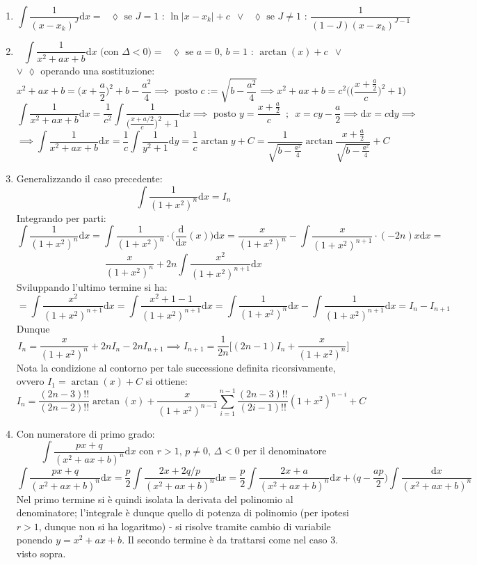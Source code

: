\documentclass[10pt]{article}
\theoremstyle{plain}
\begin{document}
\begin{enumerate}
    \item \[\int \frac{1}{(x - x_k)^J} \textrm{d}x = \textrm{ $\lozenge$ se $J = 1$ : } \ln|x - x_k| + c \enspace \lor \textrm{ $\lozenge$ se $J \neq 1$ : } \frac{1}{(1 - J) (x - x_k)^{J - 1}}\]
    \item 
    \[\int \frac{1}{x^2 + a x + b} \textrm{d}x \textrm{ (con $\Delta < 0$)} = \textrm{ $\lozenge$ se $a = 0$, $b = 1$ : } \arctan (x) + c \enspace \lor \]
    $\lor$ $\lozenge$ operando una sostituzione:
    \[x^2 + a x + b = \big( x + \frac{a}{2}\big)^2 + b - \frac{a^2}{4} \implies \textrm{ posto } c := \sqrt{b - \frac{a^2}{4}} \implies x^2 + a x + b = c^2 \bigg(\big( \frac{x + \frac{a}{2}}{c}\big)^2 + 1\bigg)\]
    \[\int \frac{1}{x^2 + a x + b} \textrm{d}x = \frac{1}{c^2} \int \frac{1}{\big( \frac{x + a/2}{c}\big)^2 + 1} \textrm{d}x \implies \textrm{ posto } y = \frac{x + \frac{a}{2}}{c} \enspace ; \enspace x = c y - \frac{a}{2} \implies \textrm{d}x = c \textrm{d}y \implies\]
    \[\implies \int \frac{1}{x^2 + a x + b} \textrm{d}x = \frac{1}{c} \int \frac{1}{y^2 + 1} \textrm{d}y = \frac{1}{c} \arctan{y} + C = \frac{1}{\sqrt{b - \frac{a^2}{4}}} \arctan{\frac{x + \frac{a}{2}}{\sqrt{b - \frac{a^2}{4}}}} + C\]
    \item Generalizzando il caso precedente:
    \[\int \frac{1}{(1 + x^2)^n} \textrm{d}x = I_n\]
    Integrando per parti:
    \[\int \frac{1}{(1 + x^2)^n} \textrm{d}x = \int \frac{1}{(1 + x^2)^n} \cdot \big(\frac{\textrm{d}}{\textrm{d}x}(x)\big)\textrm{d}x = \frac{x}{(1 + x^2)^n} - \int \frac{x}{(1 + x^2)^{n+1}}\cdot (-2n) x \textrm{d}x =\]
    \[\frac{x}{(1 + x^2)^n} + 2n \int \frac{x^2}{(1 + x^2)^{n+1}} \textrm{d}x\]
    Sviluppando l'ultimo termine si ha:
    \[= \int \frac{x^2}{(1 + x^2)^{n+1}} \textrm{d}x = \int \frac{x^2 + 1 - 1}{(1 + x^2)^{n+1}} \textrm{d}x = \int \frac{1}{(1 + x^2)^{n}} \textrm{d}x - \int \frac{1}{(1 + x^2)^{n+1}} \textrm{d}x = I_n - I_{n+1}\]
    Dunque 
    \[I_n = \frac{x}{(1+x^2)^n} + 2n I_n - 2n I_{n+1} \implies I_{n+1} = \frac{1}{2n}\bigg[(2n - 1) I_n + \frac{x}{(1+x^2)^n}\bigg]\]
    Nota la condizione al contorno per tale successione definita ricorsivamente, ovvero $I_1 = \arctan (x) + C$ si ottiene:
    \[I_n = \frac{(2n-3)!!}{(2n-2)!!}\arctan(x) + \frac{x}{(1+x^2)^{n-1}}\sum\limits_{i=1}^{n-1} \frac{(2n-3)!!}{(2i-1)!!}(1+x^2)^{n-i} + C\]
    \item Con numeratore di primo grado:
    \[\int \frac{p x + q}{(x^2 + a x + b)^n} \textrm{d}x \textrm{ con $r > 1$, $p \neq 0$, $\Delta < 0$ per il denominatore}\]
    \[\int \frac{p x + q}{(x^2 + a x + b)^n} \textrm{d}x = \frac{p}{2} \int \frac{2 x + 2q\big/p}{(x^2 + a x + b)^n} \textrm{d}x = \frac{p}{2} \int \frac{2 x + a}{(x^2 + a x + b)^n} \textrm{d}x + \big(q - \frac{ap}{2}\big) \int \frac{\textrm{d}x}{(x^2 + a x + b)^n}\]
    Nel primo termine si è quindi isolata la derivata del polinomio al denominatore; l'integrale è dunque quello di potenza di polinomio (per ipotesi $r > 1$, dunque non si ha logaritmo) - si risolve tramite cambio di variabile ponendo $y = x^2 + a x + b$. Il secondo termine è da trattarsi come nel caso 3. visto sopra.
\end{enumerate}
\end{document}
